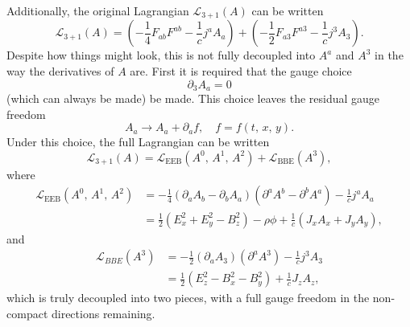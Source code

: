 \documentclass{article}
\begin{document}
\noindent Additionally, the original Lagrangian $\mathcal{L}_{3+1}\left(A\right)$ can be written
\begin{equation}
    \mathcal{L}_{3+1}\left(A\right) = \left(-\frac{1}{4}F_{ab}F^{ab} - \frac{1}{c}j^{a}A_{a} \right) + \left(-\frac{1}{2}F_{a3}F^{a3} - \frac{1}{c}j^{3}A_{3}\right).
\end{equation}
Despite how things might look, this is not fully decoupled into $A^{a}$ and $A^{3}$ in the way the derivatives of $A$ are. First it is required that the gauge choice
\begin{equation}
    \partial_{3}A_{a}=0
\end{equation}
(which can always be made) be made. This choice leaves the residual gauge freedom
\begin{equation}
    A_{a}\rightarrow A_{a}+\partial_{a}f,\quad f=f\left(t,\,x,\,y\right). 
\end{equation}
Under this choice, the full Lagrangian can be written
\begin{equation}
    \mathcal{L}_{3+1}\left(A\right) = \mathcal{L}_{\text{EEB}}\left(A^{0},\,A^{1},\,A^{2}\right) + \mathcal{L}_{\text{BBE}}\left(A^{3}\right),
\end{equation}
where
\begin{align}
    \mathcal{L}_{\text{EEB}}\left(A^{0},\,A^{1},\,A^{2} \right) &= -\frac{1}{4}\left(\partial_{a}A_{b}-\partial_{b}A_{a}\right)\left(\partial^{a}A^{b} - \partial^{b}A^{a}\right) - \frac{1}{c}j^{a}A_{a}\\
    &= \frac{1}{2}\left(E_{x}^{2}+E_{y}^{2}-B_{z}^{2}\right) - \rho\phi + \frac{1}{c}\left(J_{x}A_{x}+J_{y}A_{y}\right),
\end{align}
and 
\begin{align}
    \mathcal{L}_{BBE}\left(A^{3}\right) &= -\frac{1}{2}\left(\partial_{a}A_{3}\right)\left(\partial^{a}A^{3}\right) - \frac{1}{c}j^{3}A_{3}\\
    &= \frac{1}{2}\left(E_{z}^{2} - B_{x}^{2}-B_{y}^{2}\right) + \frac{1}{c}J_{z}A_{z},
\end{align}
which is truly decoupled into two pieces, with a full gauge freedom in the non-compact directions remaining.
\end{document}
